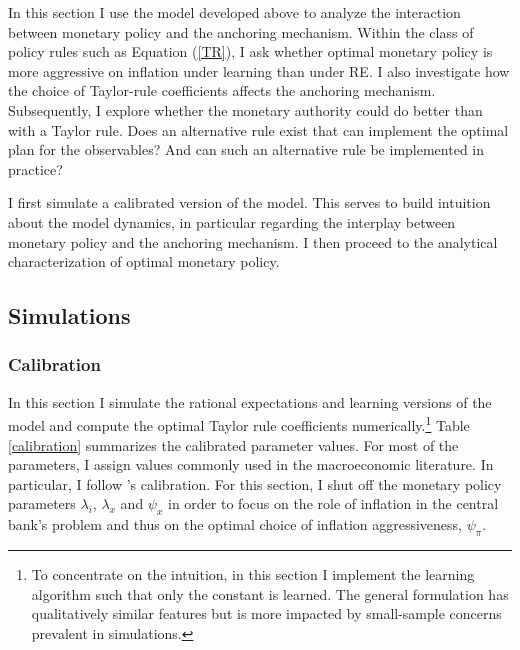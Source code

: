 \documentclass[11pt]{article}
\renewcommand{\[}{\begin{equation}}
\renewcommand{\]}{\end{equation}}
\begin{document}
In this section I use the model developed above to analyze the interaction between monetary policy and the anchoring mechanism. Within the class of policy rules such as Equation (\ref{TR}), I ask whether optimal monetary policy is more aggressive on inflation under learning than under RE. I also investigate how the choice of Taylor-rule coefficients affects the anchoring mechanism. Subsequently, I explore whether the monetary authority could do better than with a Taylor rule. Does an alternative rule exist that can implement the optimal plan for the observables? And can such an alternative rule be implemented in practice?

I first simulate a calibrated version of the model. This serves to build intuition about the model dynamics, in particular regarding the interplay between monetary policy and the anchoring mechanism. I then proceed to the analytical characterization of optimal monetary policy. 

\subsection{Simulations}\label{results_sim}
\subsubsection{Calibration}

In this section I simulate the rational expectations and learning versions of the model and compute the optimal Taylor rule coefficients numerically.\footnote{To concentrate on the intuition, in this section I implement the learning algorithm such that only the constant is learned. The general formulation has qualitatively similar features but is more impacted by small-sample concerns prevalent in simulations.} Table \ref{calibration} summarizes the calibrated parameter values. For most of the parameters, I assign values commonly used in the macroeconomic literature. In particular, I follow \cite{woodford2011interest}'s calibration. For this section, I shut off the monetary policy parameters $\lambda_i$, $\lambda_x$ and $\psi_x$ in order to focus on the role of inflation in the central bank's problem and thus on the optimal choice of inflation aggressiveness, $\psi_{\pi}$.
\end{document}

